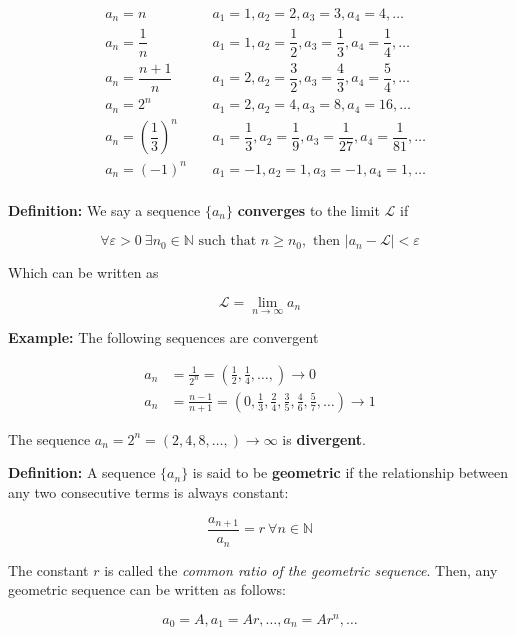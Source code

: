 \documentclass[11pt]{article}
\begin{document}
{\begin{align*}
& a_n = n & \ & a_1=1, a_2=2,  a_3=3,  a_4 = 4,  \ldots \\ 
& a_n = \dfrac{1}{n} & \ & a_1=1, a_2=\dfrac{1}{2},  a_3=\dfrac{1}{3},  a_4 = 
\dfrac{1}{4},  \ldots \\
& a_n= \dfrac{n+1}{n} & \ & a_1=2, a_2=\dfrac{3}{2},  a_3=\dfrac{4}{3},  a_4 = 
\dfrac{5}{4},  \ldots \\
& a_n = 2^n & \ & a_1=2, a_2=4,  a_3=8,  a_4 = 16,  \ldots \\
& a_n = \left( \dfrac{1}{3} \right)^n & \ & a_1=\dfrac{1}{3}, a_2=\dfrac{1}{9},  
a_3=\dfrac{1}{27},  a_4 = \dfrac{1}{81},  \ldots \\
& a_n = (-1)^n & \ & a_1=-1, a_2=1,  a_3=-1,  a_4 = 1,  \ldots \\
\end{align*}

\textbf{Definition:} We say a sequence \(\{a_n\}\) \textbf{converges} to
the limit \(\mathcal{L}\) if

\[
\forall \varepsilon > 0 \ \exists n_0 \in \mathbb{N} \text{ such that } n\geq n_0, \text{ then } \lvert a_n - \mathcal{L} \rvert < \varepsilon
\]

Which can be written as

\[
\mathcal{L} = \lim_{n\rightarrow\infty} a_n
\]

\textbf{Example:} The following sequences are convergent

\begin{align*}
a_n & = \frac{1}{2^n} = \left(\frac{1}{2},\frac{1}{4},\ldots,\right) \rightarrow 0 \\
a_n & = \frac{n-1}{n+1} = \left(0,\frac{1}{3},\frac{2}{4},\frac{3}{5},\frac{4}{6},\frac{5}{7},\ldots\right) \rightarrow 1
\end{align*}

The sequence
\(a_n = 2^n = \left(2,4,8,\ldots,\right) \rightarrow \infty\) is
\textbf{divergent}.

\textbf{Definition:} A sequence \(\{a_n\}\) is said to be
\textbf{geometric} if the relationship between any two consecutive terms
is always constant:

\[
\frac{a_{n+1}}{a_n} = r \ \forall n\in\mathbb{N}
\]

The constant \(r\) is called the \emph{common ratio of the geometric
sequence}. Then, any geometric sequence can be written as follows:

\[
a_0 = A, a_1 = Ar, \ldots, a_n = Ar^n, \ldots
\]

}
\end{document}
